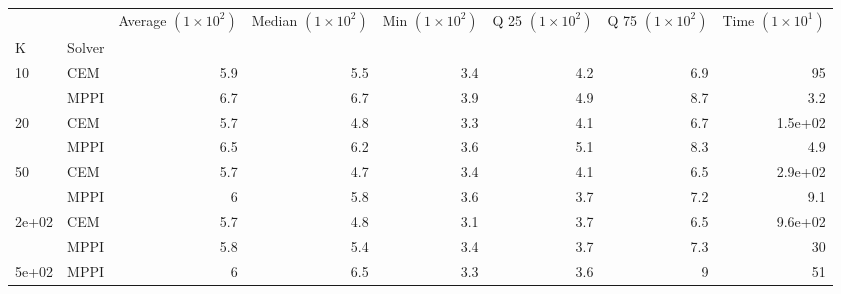 \documentclass[]{standalone}
\begin{document}
\begin{tabular}{llrrrrrr}
\toprule
      &      &  Average $(1 \times 10^2) $ &  Median $(1 \times 10^2) $ &  Min $(1 \times 10^2) $ &  Q 25 $(1 \times 10^2) $ &  Q 75 $(1 \times 10^2) $ &  Time $(1 \times 10^1) $ \\
K & Solver &                             &                            &                         &                          &                          &                          \\
\midrule
10    & CEM &                         5.9 &                        5.5 &                     3.4 &                      4.2 &                      6.9 &                       95 \\
      & MPPI &                         6.7 &                        6.7 &                     3.9 &                      4.9 &                      8.7 &                      3.2 \\
20    & CEM &                         5.7 &                        4.8 &                     3.3 &                      4.1 &                      6.7 &                  1.5e+02 \\
      & MPPI &                         6.5 &                        6.2 &                     3.6 &                      5.1 &                      8.3 &                      4.9 \\
50    & CEM &                         5.7 &                        4.7 &                     3.4 &                      4.1 &                      6.5 &                  2.9e+02 \\
      & MPPI &                           6 &                        5.8 &                     3.6 &                      3.7 &                      7.2 &                      9.1 \\
2e+02 & CEM &                         5.7 &                        4.8 &                     3.1 &                      3.7 &                      6.5 &                  9.6e+02 \\
      & MPPI &                         5.8 &                        5.4 &                     3.4 &                      3.7 &                      7.3 &                       30 \\
5e+02 & MPPI &                           6 &                        6.5 &                     3.3 &                      3.6 &                        9 &                       51 \\
\bottomrule
\end{tabular}
\end{document}
